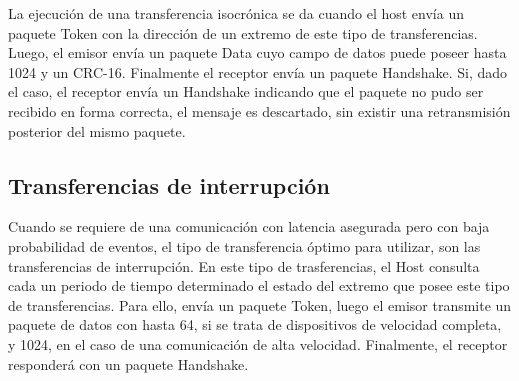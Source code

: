 	La ejecución de una transferencia isocrónica se da cuando el host envía un paquete Token con la dirección de un extremo de este tipo de transferencias. Luego, el emisor envía un paquete Data cuyo campo de datos puede poseer hasta \SI{1024}{\byte} y un CRC-16. Finalmente el receptor envía un paquete Handshake. Si, dado el caso, el receptor envía un Handshake indicando que el paquete no pudo ser recibido en forma correcta, el mensaje es descartado, sin existir una retransmisión posterior del mismo paquete.
	
\subsection{Transferencias de interrupción}
	Cuando se requiere de una comunicación con latencia asegurada pero con baja probabilidad de eventos, el tipo de transferencia óptimo para utilizar, son las transferencias de interrupción. En este tipo de trasferencias, el Host consulta cada un periodo de tiempo determinado el estado del extremo que posee este tipo de transferencias. Para ello, envía un paquete Token, luego el emisor transmite un paquete de datos con hasta \SI{64}{\byte}, si se trata de dispositivos de velocidad completa, y \SI{1024}{\byte}, en el caso de una comunicación de alta velocidad. Finalmente, el receptor responderá con un paquete Handshake.
